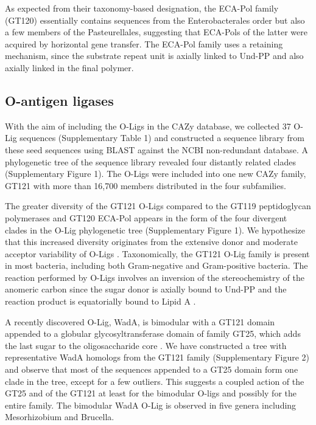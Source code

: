 \documentclass{article}
\begin{document}
As expected from their taxonomy-based designation, the ECA-Pol family (GT120) essentially contains sequences from the Enterobacterales order but also a few members of the Pasteurellales, suggesting that ECA-Pols of the latter were acquired by horizontal gene transfer. The ECA-Pol family uses a retaining mechanism, since the substrate repeat unit is axially linked to Und-PP and also axially linked in the final polymer.

\subsection{O-antigen ligases}
With the aim of including the O-Ligs in the CAZy database, we collected 37 O-Lig sequences (Supplementary Table 1) and constructed a sequence library from these seed sequences using BLAST against the NCBI non-redundant database. A phylogenetic tree of the sequence library revealed four distantly related clades (Supplementary Figure 1). The O-Ligs were included into one new CAZy family, GT121 with more than 16,700 members distributed in the four subfamilies.

The greater diversity of the GT121 O-Ligs compared to the GT119 peptidoglycan polymerases and GT120 ECA-Pol appears in the form of the four divergent clades in the O-Lig phylogenetic tree (Supplementary Figure 1). We hypothesize that this increased diversity originates from the extensive donor and moderate acceptor variability of O-Ligs \cite{di_lorenzo_journey_2022}. Taxonomically, the GT121 O-Lig family is present in most bacteria, including both Gram-negative and Gram-positive bacteria. The reaction performed by O-Ligs involves an inversion of the stereochemistry of the anomeric carbon since the sugar donor is axially bound to Und-PP and the reaction product is equatorially bound to Lipid A \cite{ruan_waal_2012}.

A recently discovered O-Lig, WadA, is bimodular with a GT121 domain appended to a globular glycosyltransferase domain of family GT25, which adds the last sugar to the oligosaccharide core \cite{servais_lipopolysaccharide_2023}. We have constructed a tree with representative WadA homologs from the GT121 family (Supplementary Figure 2) and observe that most of the sequences appended to a GT25 domain form one clade in the tree, except for a few outliers. This suggests a coupled action of the GT25 and of the GT121 at least for the bimodular O-ligs and possibly for the entire family. The bimodular WadA O-Lig is observed in five genera including Mesorhizobium and Brucella.
\end{document}
